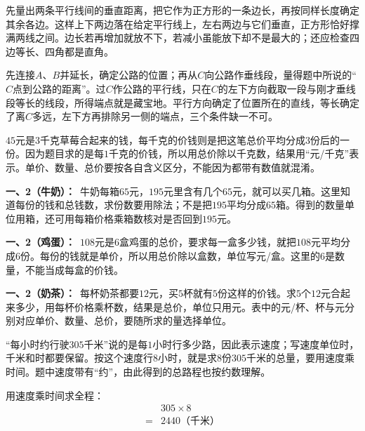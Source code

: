 \documentclass[multi=snippet,border=0pt]{standalone}
\newenvironment{snippet}[3]{\begin{minipage}{#1bp}\color{answerred}\fontsize{#2}{#3}\selectfont\raggedright}{\end{minipage}}
\begin{document}
\begin{snippet}{505}{11.5}{14}先量出两条平行线间的垂直距离，把它作为正方形的一条边长，再按同样长度确定其余各边。这样上下两边落在给定平行线上，左右两边与它们垂直，正方形恰好撑满两线之间。边长若再增加就放不下，若减小虽能放下却不是最大的；还应检查四边等长、四角都是直角。\end{snippet}
\begin{snippet}{505}{11.5}{14}先连接\(A\)、\(B\)并延长，确定公路的位置；再从\(C\)向公路作垂线段，量得题中所说的“\(C\)点到公路的距离”。过\(C\)作公路的平行线，只在\(C\)的左下方向截取一段与刚才垂线段等长的线段，所得端点就是藏宝地。平行方向确定了位置所在的直线，等长确定了离\(C\)多远，左下方再排除另一侧的端点，三个条件缺一不可。\end{snippet}
\begin{snippet}{505}{11.5}{14}\(45\)元是\(3\)千克草莓合起来的钱，每千克的价钱则是把这笔总价平均分成\(3\)份后的一份。因为题目求的是每\(1\)千克的价钱，所以用总价除以千克数，结果用“元/千克”表示。单价、数量、总价要按各自含义区分，不能因为都带有数值就混淆。\end{snippet}
\begin{snippet}{505}{11.5}{14}\textbf{一、2（牛奶）：}\ 牛奶每箱\(65\)元，\(195\)元里含有几个\(65\)元，就可以买几箱。这里知道每份的钱和总钱数，求份数要用除法；不是把\(195\)平均分成\(65\)箱。得到的数量单位用箱，还可用每箱价格乘箱数核对是否回到\(195\)元。\end{snippet}
\begin{snippet}{505}{11.5}{14}\textbf{一、2（鸡蛋）：}\ \(108\)元是\(6\)盒鸡蛋的总价，要求每一盒多少钱，就把\(108\)元平均分成\(6\)份。每份的钱就是单价，所以用总价除以盒数，单位写元/盒。这里的\(6\)是数量，不能当成每盒的价钱。\end{snippet}
\begin{snippet}{505}{11.5}{14}\textbf{一、2（奶茶）：}\ 每杯奶茶都要\(12\)元，买\(5\)杯就有\(5\)份这样的价钱。求\(5\)个\(12\)元合起来多少，用每杯价格乘杯数，结果是总价，单位只用元。表中的元/杯、杯与元分别对应单价、数量、总价，要随所求的量选择单位。\end{snippet}
\begin{snippet}{505}{11.5}{14}“每小时约行驶\(305\)千米”说的是每\(1\)小时行多少路，因此表示速度；写速度单位时，千米和时都要保留。按这个速度行\(8\)小时，就是求\(8\)份\(305\)千米的总量，要用速度乘时间。题中速度带有“约”，由此得到的总路程也按约数理解。\par 用速度乘时间求全程：\[\begin{aligned}&305\times8\\={}&2440\text{（千米）}\end{aligned}\]\end{snippet}
\end{document}
